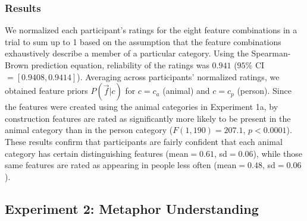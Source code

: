 \documentclass[10pt,letterpaper]{article}
\begin{document}
\subsubsection{Results} 
We normalized each participant's ratings for the eight feature combinations in a trial to sum up to 1 based on the assumption that the feature combinations exhaustively describe a member of a particular category. Using the Spearman-Brown prediction equation, reliability of the ratings was  $0.941$ ($95\%$ CI $=[0.9408, 0.9414] $). Averaging across participants' normalized ratings, we obtained feature priors $P(\vec f | c)$ for $c = c_a$ (animal) and $c = c_p$ (person).
Since the features were created using the animal categories in Experiment 1a, by construction features are rated as significantly more likely to be present in the animal category than in the person category ($F(1, 190) = 207.1$, $p < 0.0001$). These results confirm that participants are fairly confident that each animal category has certain distinguishing features (mean$= 0.61$, sd$=0.06$), while those same features are rated as appearing in people less often (mean$=0.48$, sd$=0.06$).


\subsection{Experiment 2: Metaphor Understanding}
\end{document}
